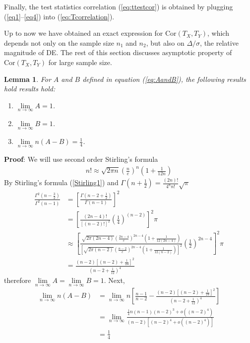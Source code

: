 \documentclass[12pt, a4paper]{article}
\newtheorem{lemma}{Lemma}
\begin{document}
	Finally,  the test statistics correlation (\ref{eq:ttestcor}) is obtained by plugging
	(\ref{eq1}--\ref{eq4}) into (\ref{eq:Tcorrelation}).
	
	Up to now we have obtained an exact expression for $\text{Cor}(T_X, T_Y)$, which depends not only on
	the sample size $n_1$ and $n_2$, but also on $\Delta/\sigma$, the relative magnitude of DE. The rest of this section
	discusses asymptotic  property of $\text{Cor}(T_X, T_Y)$ for large sample size.
	\begin{lemma}\label{lemmaLimit}
		For $A$ and $B$ defined in equation (\ref{eq:AandB}),  the following results hold
		results hold:
		\begin{enumerate}
			\item $\lim\limits_{n\rightarrow \infty} A = 1$.
			\item $\lim\limits_{n\rightarrow \infty} B = 1$.
			\item $\lim\limits_{n\rightarrow \infty} n(A-B) = \frac{1}{4}$. 
		\end{enumerate}
	\end{lemma}
	\textbf{Proof}: We will use second order Stirling's formula
	\begin{align}\label{Stirling1}
		n! \approx \sqrt{2\pi n}\left(\frac{n}{e}\right)^n(1 + \frac{1}{12n})
	\end{align}
	By Stirling's formula (\ref{Stirling1}) and  $\Gamma(n + \frac{1}{2}) =
	\frac{(2n)!}{4^nn!}\sqrt{\pi}$ 
	\begin{align*}
		\frac{\Gamma^2(n - \frac{3}{2}) }{\Gamma^2(n-1)} & =\left[\frac{\Gamma(n -2 +
			\frac{1}{2})}{\Gamma(n-1)}\right]^2\\
		&  = \left[\frac{(2n-4)!}{[(n-2)!]^2}\left(\frac{1}{4}\right)^{(n-2)}\right]^2\pi\\
		& \approx \left[\frac{\sqrt{2\pi(2n-4)}\left(\frac{2n-4}{e}\right)^{2n-4}\left(1 +
			\frac{1}{12(2n-4)}\right)}{\left[\sqrt{2\pi(n-2)}\left(\frac{n-2}{e}\right)^{2n-4}\left(1 +
			\frac{1}{12(n-2)}\right)\right]^2}\left(\frac{1}{2}\right)^{2n-4}\right]^2\pi \\
		& = \frac{(n-2)\left[(n-2) + \frac{1}{24}\right]^2}{(n-2 + \frac{1}{12})^4}
	\end{align*}
	therefore $\lim\limits _{n\rightarrow\infty}A = \lim\limits_{n\rightarrow\infty}B = 1$. Next, 
	\begin{align*}
		\lim\limits_{n\rightarrow \infty} n(A-B)& =\lim\limits_{n\rightarrow \infty} n\left[\frac{n-1}{n-2}
		- \frac{(n-2)\left[(n-2) + \frac{1}{24}\right]^2}{(n-2 + \frac{1}{12})^4}\right]\\
		& = \lim\limits_{n\rightarrow \infty}  \frac{\frac{1}{4} n(n-1)(n-2)^3 +
			o\left((n-2)^4\right)}{(n-2)\left[(n-2)^4 +  o\left((n-2)^4\right)\right]}\\
		&= \frac{1}{4}
	\end{align*}
\end{document}
